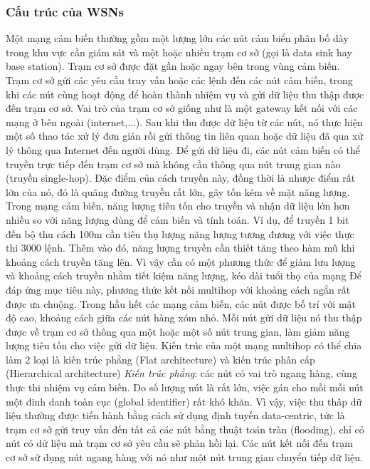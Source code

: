 \documentclass{article}
\begin{document}
\subsubsection{Cấu trúc của \gls{WSNs}}
Một mạng cảm biến thường gồm một lượng lớn các nút cảm biển phân bố dày trong khu vực cần giám sát và một hoặc nhiều trạm cơ sở (gọi là data sink hay base station). Trạm cơ sở được đặt gần hoặc ngay bên trong vùng cảm biến. Trạm cơ sở gửi các yêu cầu truy vấn hoặc các lệnh đến các nút cảm biến, trong khi các nút cùng hoạt động để hoàn thành nhiệm vụ và gửi dữ liệu thu thập được đến trạm cơ sở. Vai trò của trạm cơ sở giống như là một gateway kết nối với các mạng ở bên ngoài (internet,...). Sau khi thu được dữ liệu từ các nút, nó thực hiện một số thao tác xử lý đơn giản rồi gửi thông tin liên quan hoặc dữ liệu đã qua xử lý thông qua Internet đến người dùng.
\newline Để gửi dữ liệu đi, các nút cảm biến có thể truyền trực tiếp đến trạm cơ sở mà không cần thông qua nút trung gian nào (truyền single-hop). Đặc điểm của cách truyền này, đồng thời là nhược điểm rất lớn của nó, đó là quãng đường truyền rất lớn, gây tốn kém về mặt năng lượng. Trong mạng cảm biến, năng lượng tiêu tốn cho truyền và nhận dữ liệu lớn hơn nhiều so với năng lượng dùng để cảm biến và tính toán. Ví dụ, để truyền 1 bit đến bộ thu cách 100m cần tiêu thụ lượng năng lượng tương đương với việc thực thi 3000 lệnh. Thêm vào đó, năng lượng truyền cần thiết tăng theo hàm mũ khi khoảng cách truyền tăng lên. Vì vậy cần có một phương thức để giảm lưu lượng  và khoảng cách truyền nhằm tiết kiệm năng lượng, kéo dài tuổi thọ của mạng
\newline Để đáp ứng mục tiêu này, phương thức kết nối multihop với khoảng cách ngắn rất được ưa chuộng. Trong hầu hết các mạng cảm biến, các nút được bố trí với mật độ cao, khoảng cách giữa các nút hàng xóm nhỏ. Mỗi nút gửi dữ liệu nó thu thập được về trạm cơ sở thông qua một hoặc một số nút trung gian, làm giảm năng lượng tiêu tốn cho việc gửi dữ liệu. Kiến trúc của một mạng multihop có thể chia làm 2 loại là kiến trúc phẳng (Flat architecture) và kiến trúc phân cấp (Hierarchical architecture)
\newline \emph{Kiến trúc phẳng}: các nút có vai trò ngang hàng, cùng thực thi nhiệm vụ cảm biến. Do số lượng nút là rất lớn, việc gán cho mỗi mỗi nút một đinh danh toàn cục (global identifier) rất khó khăn. Vì vậy, việc thu thâp dữ liệu thường được tiến hành bằng cách sử dụng định tuyến data-centric, tức là trạm cơ sở gửi truy vấn đến tất cả các nút bằng thuật toán tràn (flooding), chỉ có nút có dữ liệu mà trạm cơ sở yêu cầu sẽ phản hồi lại. Các nút kết nối đến trạm cơ sở sử dụng nút ngang hàng với nó như một nút trung gian chuyển tiếp dữ liệu.
\end{document}
